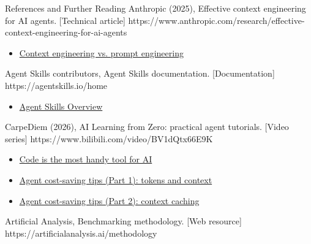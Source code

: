 \begin{frame}{References and Further Reading}
  {Anthropic (2025), Effective context engineering for AI agents. [Technical article]}
  {https://www.anthropic.com/research/effective-context-engineering-for-ai-agents}
  {\begin{itemize}
\item \href{https://www.anthropic.com/research/effective-context-engineering-for-ai-agents}{Context engineering vs. prompt engineering}
\end{itemize}}
  {Agent Skills contributors, Agent Skills documentation. [Documentation]}
  {https://agentskills.io/home}
  {\begin{itemize}
\item \href{https://agentskills.io/home}{Agent Skills Overview}
\end{itemize}}
  {CarpeDiem (2026), AI Learning from Zero: practical agent tutorials. [Video series]}
  {https://www.bilibili.com/video/BV1dQtx66E9K}
  {\begin{itemize}
\item \href{https://www.bilibili.com/video/BV1dQtx66E9K}{Code is the most handy tool for AI}
\item \href{https://www.bilibili.com/video/BV1fsbH6iEyq}{Agent cost-saving tips (Part 1): tokens and context}
\item \href{https://www.bilibili.com/video/BV1ZUek6uE54}{Agent cost-saving tips (Part 2): context caching}
\end{itemize}}
  {Artificial Analysis, Benchmarking methodology. [Web resource]}
  {https://artificialanalysis.ai/methodology}
  {}
\end{frame}
\else
